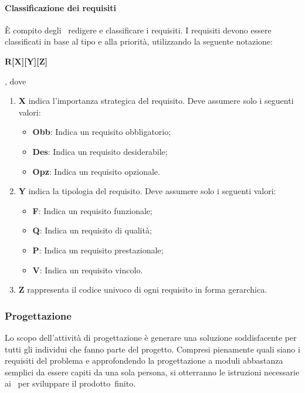 \documentclass[../NormeProgetto.text]{subfiles}
\begin{document}
				\paragraph{Classificazione dei requisiti}
					È compito degli \analisti\ redigere e classificare i requisiti.  I requisiti devono essere classificati in base al tipo e alla priorità, utilizzando la seguente notazione:
					\begin{center}\textbf{R[X][Y][Z]}\end{center}, dove
						\begin{enumerate}
							\item \textbf{X} indica l'importanza strategica del requisito. Deve assumere solo i seguenti valori:
							\begin{itemize}
								\item \textbf{Obb}: Indica un requisito obbligatorio;
								\item \textbf{Des}: Indica un requisito desiderabile;
								\item \textbf{Opz}: Indica un requisito opzionale.
							\end{itemize}
							\item \textbf{Y} indica la tipologia del requisito. Deve assumere solo i seguenti valori:
							\begin{itemize}
								\item \textbf{F}: Indica un requisito funzionale;
								\item \textbf{Q}: Indica un requisito di qualità;
								\item \textbf{P}: Indica un requisito prestazionale;
								\item \textbf{V}: Indica un requisito vincolo.
							\end{itemize}
							\item \textbf{Z} rappresenta il codice univoco di ogni requisito in forma gerarchica.
						\end{enumerate}
		\subsubsection{Progettazione}
			Lo scopo dell'attività di progettazione è generare una soluzione soddisfacente per tutti gli individui che fanno parte del progetto. Compresi pienamente quali siano i requisiti del problema e approfondendo la progettazione a moduli abbastanza semplici da essere capiti da una sola persona, si otterranno le istruzioni necessarie ai \programmatori\ per sviluppare il prodotto\g\ finito.
\end{document}
